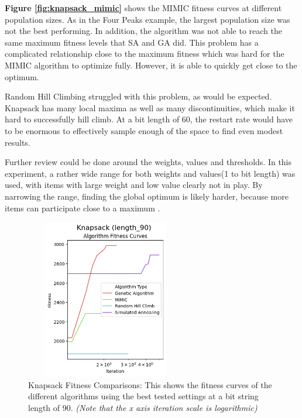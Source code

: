 \documentclass[letterpaper]{article} %
\begin{document}
\textbf{Figure \ref{fig:knapsack_mimic}} shows the MIMIC fitness curves at different population sizes.   As in the Four Peaks example, the largest population size was not the best performing.  In addition, the algorithm was not able to reach the same maximum fitness levels that SA and GA did.  This problem has a complicated relationship close to the maximum fitness which was hard for the MIMIC algorithm to optimize fully.  However, it is able to quickly get close to the optimum.

Random Hill Climbing struggled with this problem, as would be expected.  Knapsack has many local maxima as well as many discontinuities, which make it hard to successfully hill climb.   At a bit length of 60, the restart rate would have to be enormous to effectively sample enough of the space to find even modest results.

Further review could be done around the weights, values and thresholds.  In this experiment,  a rather wide range for both weights and values(1 to bit length) was used, with items with large weight and low value clearly not in play.  By narrowing the range, finding the global optimum is likely harder, because more items can participate close to a maximum .

\begin{figure}[!htb]
\centering
\includegraphics[width=2.75in, height=2.75in]{figures/Knapsack_length_90_Algorithm_Fitness_Curves__log.png}
\caption{Knapsack Fitness Comparisons: This shows the fitness curves of the different algorithms using the best tested settings at a bit string length of 90. \emph{(Note that the x axis iteration scale is logarithmic)} }
\label{fig:knapsack_fitness_comparison_90}
\end{figure}
\end{document}
